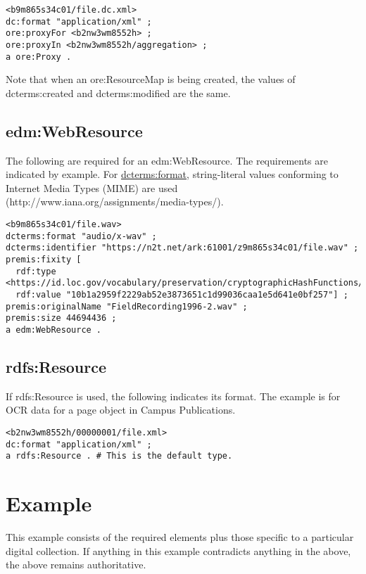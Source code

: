 \documentclass[11pt]{article}
\begin{document}
\begin{verbatim}
<b9m865s34c01/file.dc.xml>
dc:format "application/xml" ;
ore:proxyFor <b2nw3wm8552h> ;
ore:proxyIn <b2nw3wm8552h/aggregation> ;
a ore:Proxy .
\end{verbatim}

Note that when an ore:ResourceMap is being created, the values of dcterms:created and dcterms:modified are the same.

\subsection{edm:WebResource}

The following are required for an edm:WebResource. The requirements are indicated by example. For \underline{dcterms:format}, string-literal values conforming to Internet Media Types (MIME) are used (http://www.iana.org/assignments/media-types/).

\begin{verbatim}
<b9m865s34c01/file.wav> 
dcterms:format "audio/x-wav" ;
dcterms:identifier "https://n2t.net/ark:61001/z9m865s34c01/file.wav" ;
premis:fixity [
  rdf:type <https://id.loc.gov/vocabulary/preservation/cryptographicHashFunctions/sha512>;
  rdf:value "10b1a2959f2229ab52e3873651c1d99036caa1e5d641e0bf257"] ;
premis:originalName "FieldRecording1996-2.wav" ;
premis:size 44694436 ;
a edm:WebResource .
\end{verbatim}

\subsection{rdfs:Resource}

If rdfs:Resource is used, the following indicates its format. The example is for OCR data for a page object in Campus Publications.

\begin{verbatim}
<b2nw3wm8552h/00000001/file.xml>
dc:format "application/xml" ;
a rdfs:Resource . # This is the default type. 
\end{verbatim}

\pagebreak[4]
\section{Example}
This example consists of the required elements plus those specific to a particular digital collection. If anything in this example contradicts anything in the above, the above remains authoritative.


\end{document}
